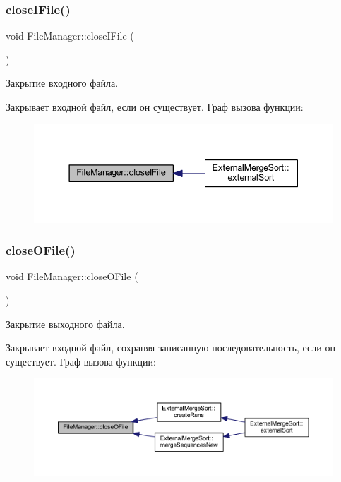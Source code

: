 \subsubsection{\texorpdfstring{close\+I\+File()}{closeIFile()}}
{\footnotesize\ttfamily void File\+Manager\+::close\+I\+File (\begin{DoxyParamCaption}{ }\end{DoxyParamCaption})}



Закрытие входного файла. 

Закрывает входной файл, если он существует. Граф вызова функции\+:\nopagebreak
\begin{figure}[H]
\begin{center}
\leavevmode
\includegraphics[width=337pt]{class_file_manager_a4a4719a410ca31985e8b75ad75485ce6_icgraph}
\end{center}
\end{figure}
\hypertarget{class_file_manager_a6a1f1ddbf047fc7e9531f483e4c62148}{}\label{class_file_manager_a6a1f1ddbf047fc7e9531f483e4c62148} 
\subsubsection{\texorpdfstring{close\+O\+File()}{closeOFile()}}
{\footnotesize\ttfamily void File\+Manager\+::close\+O\+File (\begin{DoxyParamCaption}{ }\end{DoxyParamCaption})}



Закрытие выходного файла. 

Закрывает входной файл, сохраняя записанную последовательность, если он существует. Граф вызова функции\+:\nopagebreak
\begin{figure}[H]
\begin{center}
\leavevmode
\includegraphics[width=350pt]{class_file_manager_a6a1f1ddbf047fc7e9531f483e4c62148_icgraph}
\end{center}
\end{figure}
\hypertarget{class_file_manager_a654c8bf606626cd419f5828839cb21a1}{}\label{class_file_manager_a654c8bf606626cd419f5828839cb21a1} 
